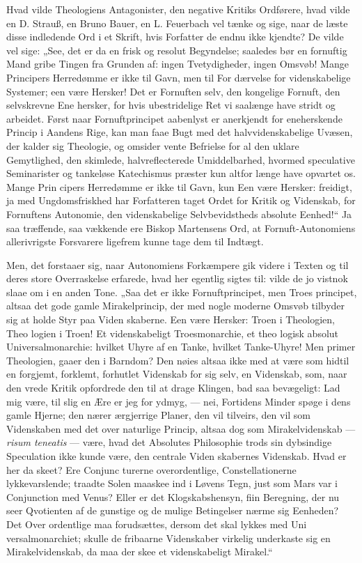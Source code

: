 \documentclass[12pt]{book}
\newcommand{\opage}[1]{\marginnote{\footnotesize\textit{[#1]}}}
\begin{document}
Hvad vilde Theologiens Antagonister, den negative
Kritiks Ordførere, hvad vilde en D. Strauß, en Bruno
Bauer, en L. Feuerbach vel tænke og sige, naar de læste
disse indledende Ord i et Skrift, hvis Forfatter de endnu
ikke kjendte? De vilde vel sige: „See, det er da en frisk
og resolut Begyndelse; saaledes bør en fornuftig Mand gribe
Tingen fra Grunden af: ingen Tvetydigheder, ingen Omsvøb!
Mange Principers Herredømme er ikke til Gavn, men til For\-%
dærvelse for videnskabelige Systemer; een være Hersker! Det
er Fornuften selv, den kongelige Fornuft, den selvskrevne Ene\-%
hersker, for hvis ubestridelige Ret vi saalænge have stridt og
\opage{2}\setcounter{footnote}{0}%
arbeidet. Først naar Fornuftprincipet aabenlyst er anerkjendt
for eneherskende Princip i Aandens Rige, kan man faae
Bugt med det halvvidenskabelige Uvæsen, der kalder sig
Theologie, og omsider vente Befrielse for al den uklare
Gemytlighed, den skimlede, halvreflecterede Umiddelbarhed,
hvormed speculative Seminarister og tankeløse Katechismus\-%
præster kun altfor længe have opvartet os. Mange Prin\-%
cipers Herredømme er ikke til Gavn, kun Een være Hersker:
freidigt, ja med Ungdomsfriskhed har Forfatteren taget
Ordet for Kritik og Videnskab, for Fornuftens Autonomie,
den videnskabelige Selvbevidstheds absolute Eenhed!“ Ja
saa træffende, saa vækkende ere Biskop Martensens Ord, at
Fornuft-Autonomiens allerivrigste Forsvarere ligefrem kunne
tage dem til Indtægt.

Men, det forstaaer sig, naar Autonomiens Forkæmpere
gik videre i Texten og til deres store Overraskelse erfarede,
hvad her egentlig sigtes til: vilde de jo vistnok slaae om i en
anden Tone. „Saa det er ikke Fornuftprincipet, men Troes\-%
principet, altsaa det gode gamle Mirakelprincip, der med nogle
moderne Omsvøb tilbyder sig at holde Styr paa Viden\-%
skaberne. Een være Hersker: Troen i Theologien, Theo\-%
logien i Troen! Et videnskabeligt Troesmonarchie, et theo\-%
logisk absolut Universalmonarchie: hvilket Uhyre af en Tanke,
hvilket Tanke-Uhyre! Men primer Theologien, gaaer den
i Barndom? Den nøies altsaa ikke med at være som
hidtil en forgjemt, forklemt, forhutlet Videnskab for sig selv,
en Videnskab, som, naar den vrede Kritik opfordrede den
til at drage Klingen, bad saa bevægeligt: Lad mig være, til
slig en Ære er jeg for ydmyg, --- nei, Fortidens Minder
spøge i dens gamle Hjerne; den nærer ærgjerrige Planer,
den vil tilveirs, den vil som Videnskaben med det over\-%
naturlige Princip, altsaa dog som Mirakelvidenskab --- \textit{risum
teneatis} --- være, hvad det Absolutes Philosophie trods sin
dybsindige Speculation ikke kunde være, den centrale Viden\-%
\opage{3}\setcounter{footnote}{0}%
skabernes Videnskab. Hvad er her da skeet? Ere Conjunc\-%
turerne overordentlige, Constellationerne lykkevarslende; traadte
Solen maaskee ind i Løvens Tegn, just som Mars var i
Conjunction med Venus? Eller er det Klogskabshensyn,
fiin Beregning, der nu seer Qvotienten af de gunstige og
de mulige Betingelser nærme sig Eenheden? Det Over\-%
ordentlige maa forudsættes, dersom det skal lykkes med Uni\-%
versalmonarchiet; skulle de fribaarne Videnskaber virkelig
underkaste sig en Mirakelvidenskab, da maa der skee et
videnskabeligt Mirakel.“
\end{document}
